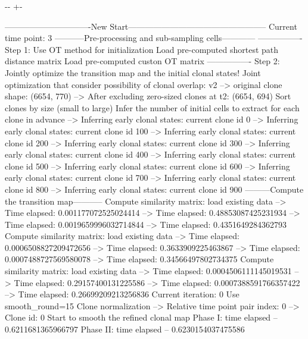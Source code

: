 \documentclass[letterpaper,10pt,english]{sphinxmanual}
\newlength\nbsphinxcodecellspacing
\begin{document}
{

\kern-\sphinxverbatimsmallskipamount\kern-\baselineskip
\kern+\FrameHeightAdjust\kern-\fboxrule
\vspace{\nbsphinxcodecellspacing}

\begin{sphinxVerbatim}[commandchars=\\\{\}]
-------------------------------New Start--------------------------------------------------
Current time point: 3
-----------Pre-processing and sub-sampling cells------------
----------------
Step 1: Use OT method for initialization
Load pre-computed shortest path distance matrix
Load pre-computed custon OT matrix
----------------
Step 2: Jointly optimize the transition map and the initial clonal states!
Joint optimization that consider possibility of clonal overlap: v2
--> original clone shape: (6654, 770)
--> After excluding zero-sized clones at t2: (6654, 694)
Sort clones by size (small to large)
Infer the number of initial cells to extract for each clone in advance
--> Inferring early clonal states: current clone id 0
--> Inferring early clonal states: current clone id 100
--> Inferring early clonal states: current clone id 200
--> Inferring early clonal states: current clone id 300
--> Inferring early clonal states: current clone id 400
--> Inferring early clonal states: current clone id 500
--> Inferring early clonal states: current clone id 600
--> Inferring early clonal states: current clone id 700
--> Inferring early clonal states: current clone id 800
--> Inferring early clonal states: current clone id 900
---------Compute the transition map-----------
Compute similarity matrix: load existing data
--> Time elapsed:  0.001177072525024414
--> Time elapsed:  0.48853087425231934
--> Time elapsed:  0.0019659996032714844
--> Time elapsed:  0.4351649284362793
Compute similarity matrix: load existing data
--> Time elapsed:  0.0006508827209472656
--> Time elapsed:  0.3633909225463867
--> Time elapsed:  0.0007488727569580078
--> Time elapsed:  0.34566497802734375
Compute similarity matrix: load existing data
--> Time elapsed:  0.0004506111145019531
--> Time elapsed:  0.29157400131225586
--> Time elapsed:  0.0007388591766357422
--> Time elapsed:  0.26699209213256836
Current iteration: 0
Use smooth\_round=15
Clone normalization
--> Relative time point pair index: 0
--> Clone id: 0
Start to smooth the refined clonal map
Phase I: time elapsed --  0.6211681365966797
Phase II: time elapsed --  0.6230154037475586

\end{sphinxVerbatim}}
\end{document}
